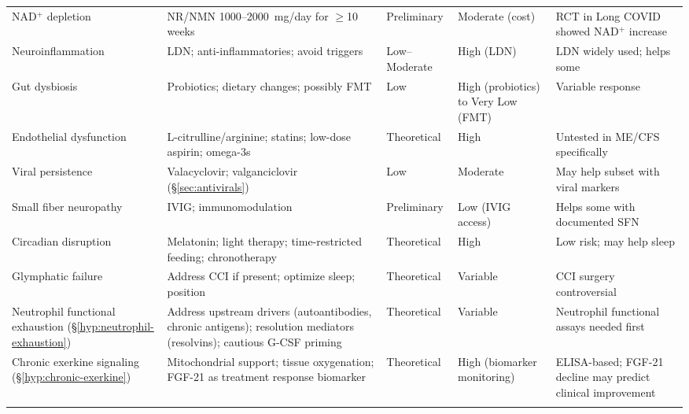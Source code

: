 \begin{longtable}{p{3.2cm}p{4.2cm}p{1.8cm}p{2.3cm}p{3.2cm}}
NAD$^+$ depletion & NR/NMN 1000--2000~mg/day for $\geq$10 weeks & Preliminary & Moderate (cost) & RCT in Long COVID showed NAD$^+$ increase \\
\addlinespace

Neuroinflammation & LDN; anti-inflammatories; avoid triggers & Low--Moderate & High (LDN) & LDN widely used; helps some \\
\addlinespace

Gut dysbiosis & Probiotics; dietary changes; possibly FMT & Low & High (probiotics) to Very Low (FMT) & Variable response \\
\addlinespace

Endothelial dysfunction & L-citrulline/arginine; statins; low-dose aspirin; omega-3s & Theoretical & High & Untested in ME/CFS specifically \\
\addlinespace

Viral persistence & Valacyclovir; valganciclovir (\S\ref{sec:antivirals}) & Low & Moderate & May help subset with viral markers \\
\addlinespace

Small fiber neuropathy & IVIG; immunomodulation & Preliminary & Low (IVIG access) & Helps some with documented SFN \\
\addlinespace

Circadian disruption & Melatonin; light therapy; time-restricted feeding; chronotherapy & Theoretical & High & Low risk; may help sleep \\
\addlinespace

Glymphatic failure & Address CCI if present; optimize sleep; position & Theoretical & Variable & CCI surgery controversial \\
\addlinespace

Neutrophil functional exhaustion (\S\ref{hyp:neutrophil-exhaustion}) & Address upstream drivers (autoantibodies, chronic antigens); resolution mediators (resolvins); cautious G-CSF priming & Theoretical & Variable & Neutrophil functional assays needed first \\
\addlinespace

Chronic exerkine signaling (\S\ref{hyp:chronic-exerkine}) & Mitochondrial support; tissue oxygenation; FGF-21 as treatment response biomarker & Theoretical & High (biomarker monitoring) & ELISA-based; FGF-21 decline may predict clinical improvement \\
\addlinespace

\end{longtable}

